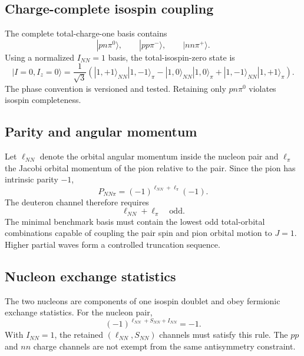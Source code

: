 \documentclass[11pt]{article}
\begin{document}
\subsection{Charge-complete isospin coupling}

The complete total-charge-one basis contains
\begin{equation}
 |pn\pi^0\rangle,
 \qquad
 |pp\pi^-\rangle,
 \qquad
 |nn\pi^+\rangle.
 \label{eq:charge-basis}
\end{equation}
Using a normalized \(I_{NN}=1\) basis, the total-isospin-zero state is
\begin{equation}
 |I=0,I_z=0\rangle
 =\frac{1}{\sqrt3}
 \left(
 |1,+1\rangle_{NN}|1,-1\rangle_{\pi}
 -|1,0\rangle_{NN}|1,0\rangle_{\pi}
 +|1,-1\rangle_{NN}|1,+1\rangle_{\pi}
 \right).
 \label{eq:isospin-zero-state}
\end{equation}
The phase convention is versioned and tested.  Retaining only \(pn\pi^0\)
violates isospin completeness.

\subsection{Parity and angular momentum}

Let \(\ell_{NN}\) denote the orbital angular momentum inside the nucleon pair
and \(\ell_{\pi}\) the Jacobi orbital momentum of the pion relative to the
pair.  Since the pion has intrinsic parity \(-1\),
\begin{equation}
 P_{NN\pi}
 =(-1)^{\ell_{NN}+\ell_{\pi}}(-1).
 \label{eq:nnpi-parity}
\end{equation}
The deuteron channel therefore requires
\begin{equation}
 \ell_{NN}+\ell_{\pi}\quad\text{odd}.
 \label{eq:odd-orbital-parity}
\end{equation}
The minimal benchmark basis must contain the lowest odd total-orbital
combinations capable of coupling the pair spin and pion orbital motion to
\(J=1\).  Higher partial waves form a controlled truncation sequence.

\subsection{Nucleon exchange statistics}

The two nucleons are components of one isospin doublet and obey fermionic
exchange statistics.  For the nucleon pair,
\begin{equation}
 (-1)^{\ell_{NN}+S_{NN}+I_{NN}}=-1.
 \label{eq:pauli-nnpi}
\end{equation}
With \(I_{NN}=1\), the retained \((\ell_{NN},S_{NN})\) channels must satisfy
this rule.  The \(pp\) and \(nn\) charge channels are not exempt from the same
antisymmetry constraint.
\end{document}
